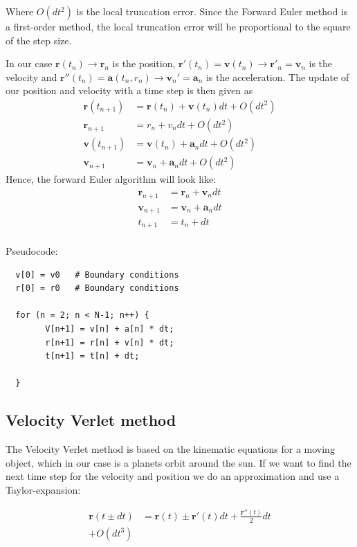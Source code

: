 \documentclass{article}
\begin{document}
Where $O(dt^2)$ is the local truncation error. Since the Forward Euler method is a first-order method, the local truncation error will be proportional to the square of the step size.

In our case $\mathbf{r}(t_n) \rightarrow \mathbf{r}_n$ is the position, $\mathbf{r}'(t_n)=\mathbf{v}(t_n) \rightarrow \mathbf{r}'_n=\mathbf{v}_n$ is the velocity and $\mathbf{r}''(t_n)=\mathbf{a}(t_n,r_n) \rightarrow \mathbf{v}_n'=\mathbf{a}_n$ is the acceleration. The update of our position and velocity with a  time step is then given as  
\begin{align*}
    \mathbf{r}(t_{n+1})&=\mathbf{r}(t_n) + \mathbf{v}(t_n)dt + O(dt^2)\\
    \mathbf{r}_{n+1}&=r_{n} + v_{n}dt + O(dt^2)\\
    \mathbf{v}(t_{n+1})&=\mathbf{v}(t_n)+\mathbf{a}_ndt + O(dt^2)\\
    \mathbf{v}_{n+1}&=\mathbf{v}_n +\mathbf{a}_n dt + O(dt^2)
\end{align*}
Hence, the forward Euler algorithm will look like:
\begin{align*}
    \mathbf{r}_{n+1}&=\mathbf{r}_n+\mathbf{v}_ndt\\
    \mathbf{v}_{n+1}&=\mathbf{v}_n+\mathbf{a}_ndt\\
    t_{n+1}&=t_n + dt
\end{align*}
\\
Pseudocode:

\begin{verbatim}
  v[0] = v0   # Boundary conditions
  r[0] = r0   # Boundary conditions

  for (n = 2; n < N-1; n++) {
        V[n+1] = v[n] + a[n] * dt;
        r[n+1] = r[n] + v[n] * dt;
        t[n+1] = t[n] + dt;
        
  }

\end{verbatim}

\subsection{Velocity Verlet method}
The Velocity Verlet method is based on the kinematic equations for a moving object, which in our case is a planets orbit around the sun. If we want to find the next time step for the velocity and position we do an approximation and use a Taylor-expansion:    

\begin{align*}
\mathbf{r}(t\pm dt)&=\mathbf{r}(t)\pm \mathbf{r}'(t)dt + \frac{\mathbf{r}''(t)}{2}dt\\ + O(dt^3)
\end{align*}
\end{document}
